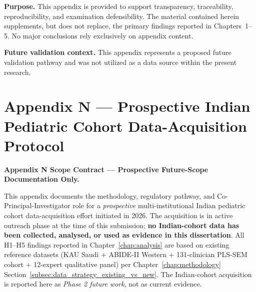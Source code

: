 

\noindent\textbf{Purpose.} This appendix is provided to support transparency, traceability, reproducibility, and examination defensibility. The material contained herein supplements, but does not replace, the primary findings reported in Chapters~1--5. No major conclusions rely exclusively on appendix content.


\noindent\textbf{Future validation context.} This appendix represents a proposed future validation pathway and was not utilized as a data source within the present research.

\normalsize\normalfont\color{black}

\section*{Appendix N --- Prospective Indian Pediatric Cohort Data-Acquisition Protocol}
\label{sec:appendix_n_indian_cohort}
\label{chap:appendix_indian_cohort_acquisition}

\noindent\textbf{Appendix N Scope Contract --- Prospective Future-Scope Documentation Only.}
\label{para:appendix_n_scope_contract}

\noindent This appendix documents the methodology, regulatory pathway, and Co-Principal-Investigator role for a \emph{prospective} multi-institutional Indian pediatric cohort data-acquisition effort initiated in 2026. The acquisition is in active outreach phase at the time of this submission; \textbf{no Indian-cohort data has been collected, analysed, or used as evidence in this dissertation}. All H1--H5 findings reported in Chapter~\ref{chap:analysis} are based on existing reference datasets (KAU Saudi + ABIDE-II Western + 131-clinician PLS-SEM cohort + 12-expert qualitative panel) per Chapter~\ref{chap:methodology} Section~\ref{subsec:data_strategy_existing_vs_new}. The Indian-cohort acquisition is reported here as \emph{Phase 2 future work}, not as current evidence.

